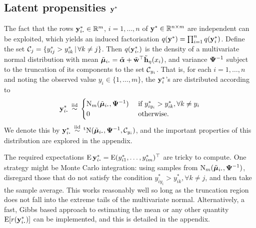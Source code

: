 \subsection{Latent propensities \texorpdfstring{${\mathbf y}^*$}{$y^*$}}

The fact that the rows $\by_{i \bigcdot}^* \in \bbR^m$, $i=1,\dots,n$ of ${\mathbf y}^* \in \mathbb{R}^{n \times m}$ are independent can be exploited, which yields an induced factorisation $q({\mathbf y}^*) = \prod_{i=1}^n q({\mathbf y}_i^*)$.
Define the set ${\mathcal C}_j = \{y_{ij}^* > y_{ik}^* \,|\, \forall k\neq j \}$.
Then $q(\by_{i \bigcdot}^*)$ is the density of a multivariate normal distribution with mean $\tilde\bmu_{i \bigcdot} = \tilde\balpha + \tilde\bw^\top \tilde \bh_\eta(x_i)$, and variance ${\bm\Psi}^{-1}$ subject to the truncation of its components to the set ${\mathcal C}_{y_i}$.
That is, for each $i=1,\dots,n$ and noting the observed value $y_i \in \{1,\dots,m\}$, the ${\mathbf y}_i^*$'s are distributed according to
\begin{align}\label{eq:ystardist}
  \by_{i \bigcdot}^* \iid
  \begin{cases}
    \N_m(\tilde\bmu_{i \bigcdot},  \bPsi^{-1}) & \text{ if } y_{iy_i}^* > y_{ik}^*, \forall k \neq y_i \\
    0 & \text{ otherwise}. \\
  \end{cases}
\end{align}
We denote this by $\by_{i \bigcdot}^* \iid \tN(\tilde\bmu_{i \bigcdot}, \bPsi^{-1},\cC_{y_i})$, and the important properties of this distribution are explored in the appendix.

The required expectations $\E\by_{i \bigcdot}^* = \E (y_{i1}^*,\dots,y_{im}^*)^\top$ are tricky to compute.
One strategy might be Monte Carlo integration: using samples from $\N_m(\tilde\bmu_{i \bigcdot},  \bPsi^{-1})$, disregard those that do not satisfy the condition $y_{iy_i}^* > y_{ik}^*, \forall k \neq j$, and then take the sample average.
This works reasonably well so long as the truncation region does not fall into the extreme tails of the multivariate normal.
Alternatively, a fast, Gibbs based approach to estimating the mean or any other quantity $\E [r(\by_{i \bigcdot}^*)]$ can be implemented, and this is detailed in the appendix.

